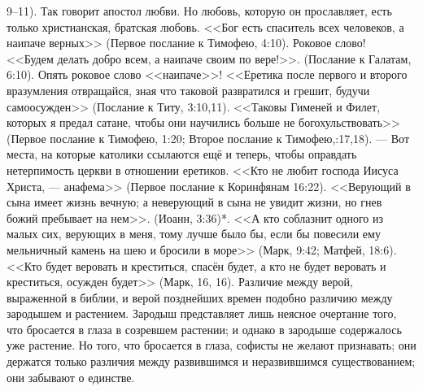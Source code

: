 \documentclass[12pt,oneside]{book}
\begin{document}
9--11). Так говорит апостол любви. Но любовь, которую он прославляет, есть только христианская, братская любовь. <<Бог есть спаситель всех человеков, а наипаче верных>> (Первое послание к Тимофею, 4:10). Роковое слово! <<Будем делать добро всем, а наипаче своим по вере!>>. (Послание к Галатам, 6:10). Опять роковое слово <<наипаче>>! <<Еретика после первого и второго вразумления отвращайся, зная что таковой развратился и грешит, будучи самоосужден>> (Послание к Титу, 3:10,11). <<Таковы Гименей и Филет, которых я предал сатане, чтобы они научились больше не богохульствовать>> (Первое послание к Тимофею, 1:20; Второе послание к Тимофею,:17,18). --- Вот места, на которые католики ссылаются ещё и теперь, чтобы оправдать нетерпимость церкви в отношении еретиков. <<Кто не любит господа Иисуса Христа, --- анафема>> (Первое послание к Коринфянам 16:22). <<Верующий в сына имеет жизнь вечную; а неверующий в сына не увидит жизни, но гнев божий пребывает на нем>>. (Иоанн, 3:36)*\let\svthefootnote\thefootnote\let\thefootnote\relax{}\let\thefootnote\svthefootnote\dag\let\svthefootnote\thefootnote\let\thefootnote\relax{}\let\thefootnote\svthefootnote. <<А кто соблазнит одного из малых сих, верующих в меня, тому лучше было бы, если бы повесили ему мельничный камень на шею и бросили в море>> (Марк, 9:42; Матфей, 18:6). <<Кто будет веровать и креститься, спасён будет, а кто не будет веровать и креститься, осужден будет>> (Марк, 16, 16). Различие между верой, выраженной в библии, и верой позднейших времен подобно различию между зародышем и растением. Зародыш представляет лишь неясное очертание того, что бросается в глаза в созревшем растении; и однако в зародыше содержалось уже растение. Но того, что бросается в глаза, софисты не желают признавать; они держатся только различия между развившимся и неразвившимся существованием; они забывают о единстве.
\end{document}
